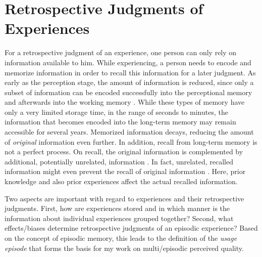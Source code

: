 \section{Retrospective Judgments of Experiences}\label{chap:03}
For a retrospective judgment of an experience, one person can only rely on information available to him.
While experiencing, a person needs to encode and memorize information in order to recall this information for a later judgment.
As early as the perception stage, the amount of information is reduced, since only a subset of information can be encoded successfully into the perceptional memory and afterwards into the working memory \citep[][p.\,8f.]{raake_speech_2006}.
While these types of memory have only a very limited storage time, in the range of seconds to minutes, the information that becomes encoded into the long-term memory may remain accessible for several years.
Memorized information decays, reducing the amount of \emph{original} information even further.
In addition, recall from long-term memory is not a perfect process.
On recall, the original information is complemented by additional, potentially unrelated, information \citep[\cf,][]{schacter_seven_2003}.
In fact, unrelated, recalled information might even prevent the recall of original information \citep[\cf,][]{schacter_seven_2003}.
Here, prior knowledge and also prior experiences affect the actual recalled information.

Two aspects are important with regard to experiences and their retrospective judgments.
First, how are experiences stored and in which manner is the information about individual experiences grouped together?
Second, what effects/biases determine retrospective judgments of an episodic experience?
Based on the concept of episodic memory, this leads to the definition of the \emph{usage episode} that forms the basis for my work on multi\-/episodic perceived quality.


